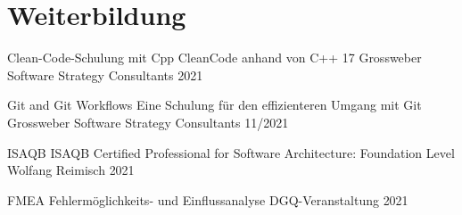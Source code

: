 
\section{Weiterbildung}
\begin{cvhonors}

\cvhonor
{Clean-Code-Schulung mit Cpp} %
{CleanCode anhand von C++ 17} %
{Grossweber Software Strategy Consultants} %
{2021} %


\cvhonor
{Git and Git Workflows} %
{Eine Schulung für den effizienteren Umgang mit Git} %
{Grossweber Software Strategy Consultants} %
{11/2021} %

\cvhonor
{ISAQB} %
{ISAQB Certified Professional for
Software Architecture: Foundation Level} %
{Wolfang Reimisch} %
{2021} %

\cvhonor
{FMEA} %
{Fehlermöglichkeits- und Einflussanalyse} %
{DGQ-Veranstaltung} %
{2021} %

\end{cvhonors}